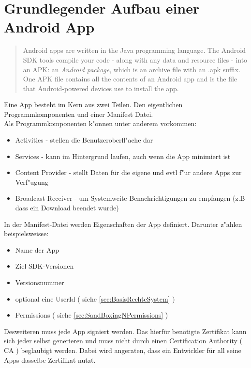 	\section{Grundlegender Aufbau einer Android App}
	\begin{quote}
	Android apps are written in the Java programming language. The Android SDK tools compile your code - along with any data and resource files - into an APK: an \textit{Android package}, which is an archive file with an .apk suffix. One APK file contains all the contents of an Android app and is the file that Android-powered devices use to install the app.
	\end{quote}
	
	Eine App besteht im Kern aus zwei Teilen. Den eigentlichen Programmkomponenten und einer Manifest Datei.
	\\
	Als Programmkomponenten k"onnen unter anderem vorkommen:
	\begin{itemize}\itemsep0pt
		\item Activities - stellen die Benutzeroberfl"ache dar
		\item Services - kann im Hintergrund laufen, auch wenn die App minimiert ist
		\item Content Provider - stellt Daten für die eigene und evtl f"ur andere Apps zur Verf"ugung
		\item Broadcast Receiver - um Systemweite Benachrichtigungen zu empfangen (z.B dass ein Download beendet wurde)
	\end{itemize}
	In der Manifest-Datei werden Eigenschaften der App definiert. Darunter z"ahlen beispielsweisse:
	\begin{itemize}\itemsep0pt
		\item Name der App
		\item Ziel SDK-Versionen
		\item Versionsnummer
		\item optional eine UserId ( siehe \ref*{sec:BasisRechteSystem} )
		\item Permissions ( siehe \ref*{sec:SandBoxingNPermissions} )
	\end{itemize}
	Desweiteren muss jede App signiert werden. Das hierfür benötigte Zertifikat kann sich jeder selbst generieren und muss nicht durch einen Certification Authority ( CA ) beglaubigt werden. Dabei wird angeraten, dass ein Entwickler für all seine Apps dasselbe Zertifikat nutzt.
